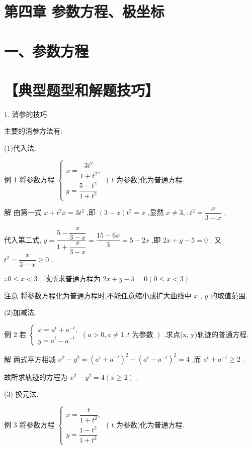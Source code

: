 \section*{第四章 参数方程、极坐标}

\section*{一、参数方程}

\section*{【典型题型和解题技巧】}

1. 消参的技巧.

主要的消参方法有:

(1)代入法.

例 1 将参数方程 $\left\{  \begin{array}{l} x = \dfrac{3{t}^{2}}{1 + {t}^{2}}, \\  y = \dfrac{5 - {t}^{2}}{1 + {t}^{2}} \end{array}\right.$ ( $t$ 为参数)化为普通方程.

解 由第一式 $x + {t}^{2}x = 3{t}^{2}$ ,即 $\left( {3 - x}\right) {t}^{2} = x$ ,显然 $x \neq  3,\therefore {t}^{2} = \dfrac{x}{3 - x}$ ,

代入第二式, $y = \dfrac{5 - \dfrac{x}{3 - x}}{1 + \dfrac{x}{3 - x}} = \dfrac{{15} - {6x}}{3} = 5 - {2x}$ ,即 ${2x} + y - 5 = 0$ . 又 ${t}^{2} = \dfrac{x}{3 - x} \geq  0$ .

$\therefore 0 \leq  x < 3$ . 故所求普通方程为 ${2x} + y - 5 = 0\left( {0 \leq  x < 3}\right)$ .

注意 将参数方程化为普通方程时,不能任意缩小或扩大曲线中 $x$ , $y$ 的取值范围.

(2)加减法.

例 2 若 $\left\{  {\begin{array}{l} x = {a}^{t} + {a}^{-t}, \\  y = {a}^{t} - {a}^{-t} \end{array}\left( {a > 0,a \neq  1,t\text{ 为参数 }}\right) }\right.$ ,求点(x, y)轨迹的普通方程.

解 两式平方相减 ${x}^{2} - {y}^{2} = {\left( {a}^{t} + {a}^{-t}\right) }^{2} - {\left( {a}^{t} - {a}^{-t}\right) }^{2} = 4$ ,而 ${a}^{t} + {a}^{-t} \geq  2$ .

故所求轨迹的方程为 ${x}^{2} - {y}^{2} = 4\left( {x \geq  2}\right)$ .

(3) 换元法.

例 3 将参数方程 $\left\{  \begin{array}{l} x = \dfrac{t}{1 + {t}^{2}}, \\  y = \dfrac{1 - {t}^{2}}{1 + {t}^{2}} \end{array}\right.$ ( $t$ 为参数)化为普通方程.


